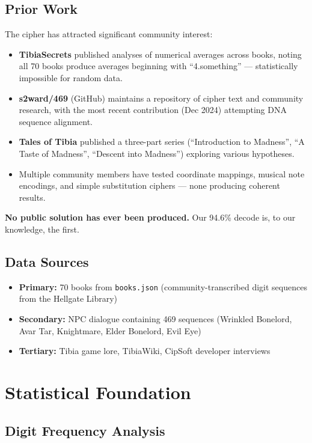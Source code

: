 \documentclass[11pt,a4paper]{article}
\begin{document}
\subsection{Prior Work}

The cipher has attracted significant community interest:

\begin{itemize}
\item \textbf{TibiaSecrets} published analyses of numerical averages across books, noting all 70 books produce averages beginning with ``4.something'' --- statistically impossible for random data.
\item \textbf{s2ward/469} (GitHub) maintains a repository of cipher text and community research, with the most recent contribution (Dec 2024) attempting DNA sequence alignment.
\item \textbf{Tales of Tibia} published a three-part series (``Introduction to Madness'', ``A Taste of Madness'', ``Descent into Madness'') exploring various hypotheses.
\item Multiple community members have tested coordinate mappings, musical note encodings, and simple substitution ciphers --- none producing coherent results.
\end{itemize}

\textbf{No public solution has ever been produced.} Our 94.6\% decode is, to our knowledge, the first.

\subsection{Data Sources}

\begin{itemize}
\item \textbf{Primary:} 70 books from \texttt{books.json} (community-transcribed digit sequences from the Hellgate Library)
\item \textbf{Secondary:} NPC dialogue containing 469 sequences (Wrinkled Bonelord, Avar Tar, Knightmare, Elder Bonelord, Evil Eye)
\item \textbf{Tertiary:} Tibia game lore, TibiaWiki, CipSoft developer interviews
\end{itemize}

\section{Statistical Foundation}

\subsection{Digit Frequency Analysis}
\end{document}
